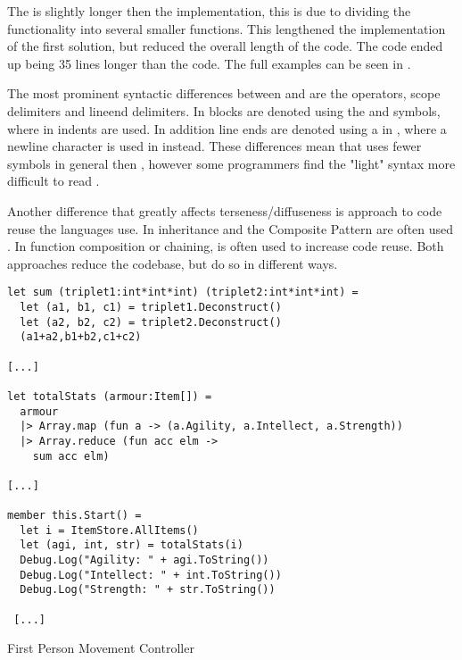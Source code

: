The \fs is slightly longer then the \cs implementation, this is due to dividing the functionality into several smaller functions. This lengthened the implementation of the first solution, but reduced the overall length of the code. The \cs code ended up being 35 lines longer than the \fs code. The full examples can be seen in .

The most prominent syntactic differences between \cs and \fs are the operators, scope delimiters and lineend delimiters. In \cs blocks are denoted using the \m{\{} and \m{\}} symbols, where in \fs indents are used. In addition line ends are denoted using a \m{;} in \cs, where a newline character is used in \fs instead. These differences mean that \fs uses fewer symbols in general then \cs, however some programmers find the "light" syntax more difficult to read \needcite.

Another difference that greatly affects terseness/diffuseness is approach to code reuse the languages use. In \cs inheritance and the Composite Pattern \needcite are often used \needcite. In \fs function composition or chaining, is often used to increase code reuse. Both approaches reduce the codebase, but do so in different ways.

\begin{listing}[H]
\begin{verbatim}
let sum (triplet1:int*int*int) (triplet2:int*int*int) =
  let (a1, b1, c1) = triplet1.Deconstruct()
  let (a2, b2, c2) = triplet2.Deconstruct()
  (a1+a2,b1+b2,c1+c2)

[...]

let totalStats (armour:Item[]) =
  armour
  |> Array.map (fun a -> (a.Agility, a.Intellect, a.Strength))
  |> Array.reduce (fun acc elm ->
    sum acc elm)

[...]

member this.Start() =
  let i = ItemStore.AllItems()
  let (agi, int, str) = totalStats(i)
  Debug.Log("Agility: " + agi.ToString())
  Debug.Log("Intellect: " + int.ToString())
  Debug.Log("Strength: " + str.ToString())

 [...]
\end{verbatim}
\caption{First Person Movement Controller \fs}
\label{lst:fs-armour}
\end{listing}
